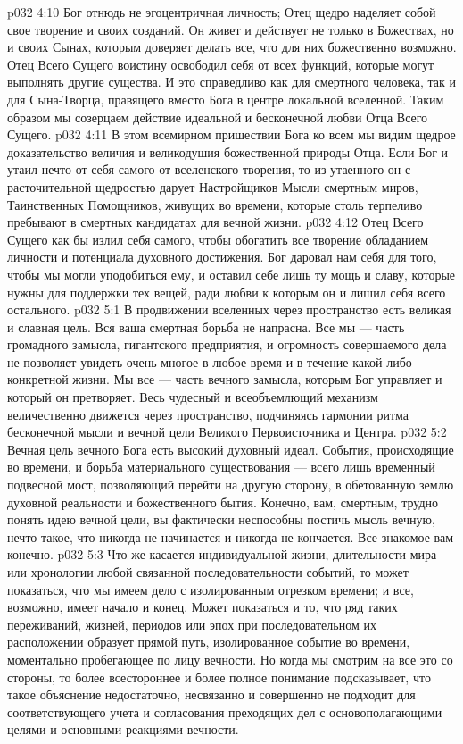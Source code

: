 \vs p032 4:10 \pc Бог отнюдь не эгоцентричная личность; Отец щедро наделяет собой свое творение и своих созданий. Он живет и действует не только в Божествах, но и своих Сынах, которым доверяет делать все, что для них божественно возможно. Отец Всего Сущего воистину освободил себя от всех функций, которые могут выполнять другие существа. И это справедливо как для смертного человека, так и для Сына\hyp{}Творца, правящего вместо Бога в центре локальной вселенной. Таким образом мы созерцаем действие идеальной и бесконечной любви Отца Всего Сущего.
\vs p032 4:11 В этом всемирном пришествии Бога ко всем мы видим щедрое доказательство величия и великодушия божественной природы Отца. Если Бог и утаил нечто от себя самого от вселенского творения, то из утаенного он с расточительной щедростью дарует Настройщиков Мысли смертным миров, Таинственных Помощников, живущих во времени, которые столь терпеливо пребывают в смертных кандидатах для вечной жизни.
\vs p032 4:12 Отец Всего Сущего как бы излил себя самого, чтобы обогатить все творение обладанием личности и потенциала духовного достижения. Бог даровал нам себя для того, чтобы мы могли уподобиться ему, и оставил себе лишь ту мощь и славу, которые нужны для поддержки тех вещей, ради любви к которым он и лишил себя всего остального.
\vs p032 5:1 В продвижении вселенных через пространство есть великая и славная цель. Вся ваша смертная борьба не напрасна. Все мы --- часть громадного замысла, гигантского предприятия, и огромность совершаемого дела не позволяет увидеть очень многое в любое время и в течение какой\hyp{}либо конкретной жизни. Мы все --- часть вечного замысла, которым Бог управляет и который он претворяет. Весь чудесный и всеобъемлющий механизм величественно движется через пространство, подчиняясь гармонии ритма бесконечной мысли и вечной цели Великого Первоисточника и Центра.
\vs p032 5:2 Вечная цель вечного Бога есть высокий духовный идеал. События, происходящие во времени, и борьба материального существования --- всего лишь временный подвесной мост, позволяющий перейти на другую сторону, в обетованную землю духовной реальности и божественного бытия. Конечно, вам, смертным, трудно понять идею вечной цели, вы фактически неспособны постичь мысль вечную, нечто такое, что никогда не начинается и никогда не кончается. Все знакомое вам конечно.
\vs p032 5:3 \pc Что же касается индивидуальной жизни, длительности мира или хронологии любой связанной последовательности событий, то может показаться, что мы имеем дело с изолированным отрезком времени; и все, возможно, имеет начало и конец. Может показаться и то, что ряд таких переживаний, жизней, периодов или эпох при последовательном их расположении образует прямой путь, изолированное событие во времени, моментально пробегающее по лицу вечности. Но когда мы смотрим на все это со стороны, то более всестороннее и более полное понимание подсказывает, что такое объяснение недостаточно, несвязанно и совершенно не подходит для соответствующего учета и согласования преходящих дел с основополагающими целями и основными реакциями вечности.

